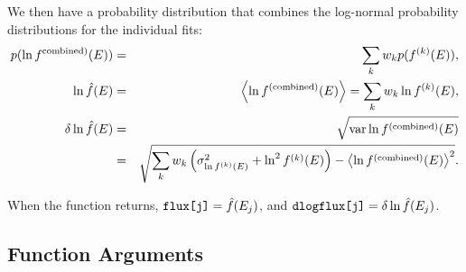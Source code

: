 \documentclass{article}    %
\newcommand{\var}{\mathop{{\rm var}}}
\begin{document}
We then have a probability distribution that combines the log-normal
probability distributions for the individual fits:
\begin{eqnarray}
p(\ln f^{\rm combined)}(E)) &=& \sum_k w_k p(f^{(k)}(E)), \\
\ln \hat{f}(E) &=& \left<\ln f^{\rm (combined)}(E)\right> = \sum_k w_k \ln f^{(k)}(E), \\
\delta\ln\hat{f}(E) &=& \sqrt{\var \ln f^{\rm (combined)}(E)} \nonumber \\
&=& 
\sqrt{\sum_k w_k \left(\sigma^2_{\ln f^{(k)}(E)}+\ln^2f^{(k)}(E)\right) - \left<\ln f^{\rm (combined)}(E)\right>^2}.
\end{eqnarray}

When the function returns, $\verb|flux[j]| = \hat{f}(E_j)$, and $\verb|dlogflux[j]| = \delta \ln \hat{f}(E_j)$.

\subsection{Function Arguments}
\label{secAnaSpecInvArgs}
\end{document}
